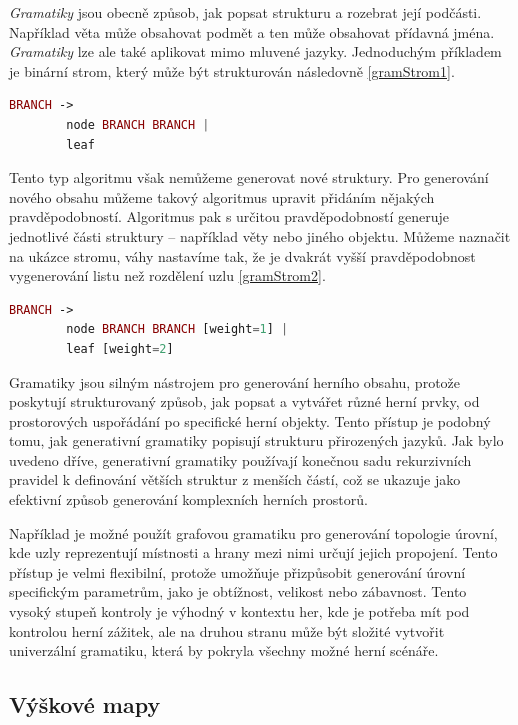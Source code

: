 \textit{Gramatiky} jsou obecně způsob, jak popsat strukturu a rozebrat její podčásti. Například věta může obsahovat podmět a ten může obsahovat přídavná jména. \textit{Gramatiky} lze ale také aplikovat mimo mluvené jazyky. Jednoduchým příkladem je binární strom, který může být strukturován následovně \vref{gramStrom1}. \cite{GramFand} \cite{GramClanek}
\begin{lstlisting}[language=php, caption=Příklad gramatiky: Strom, label=gramStrom1]
    BRANCH ->
        node BRANCH BRANCH |
        leaf
\end{lstlisting}
Tento typ algoritmu však nemůžeme generovat nové struktury. Pro generování nového obsahu můžeme takový algoritmus upravit přidáním nějakých pravděpodobností. Algoritmus pak s určitou pravděpodobností generuje jednotlivé části struktury – například věty nebo jiného objektu. Můžeme naznačit na ukázce stromu, váhy nastavíme tak, že je dvakrát vyšší pravděpodobnost vygenerování listu než rozdělení uzlu \vref{gramStrom2}. \cite{GramClanek}
\begin{lstlisting}[language=php, caption=Příklad gramatiky: Strom s váhami, label=gramStrom2]
    BRANCH ->
        node BRANCH BRANCH [weight=1] |
        leaf [weight=2]
\end{lstlisting}

Gramatiky jsou silným nástrojem pro generování herního obsahu, protože poskytují strukturovaný způsob, jak popsat a vytvářet různé herní prvky, od prostorových uspořádání po specifické herní objekty. Tento přístup je podobný tomu, jak generativní gramatiky popisují strukturu přirozených jazyků. Jak bylo uvedeno dříve, generativní gramatiky používají konečnou sadu rekurzivních pravidel k definování větších struktur z menších částí, což se ukazuje jako efektivní způsob generování komplexních herních prostorů.

Například je možné použít grafovou gramatiku pro generování topologie úrovní, kde uzly reprezentují místnosti a hrany mezi nimi určují jejich propojení. Tento přístup je velmi flexibilní, protože umožňuje přizpůsobit generování úrovní specifickým parametrům, jako je obtížnost, velikost nebo zábavnost. Tento vysoký stupeň kontroly je výhodný v kontextu her, kde je potřeba mít pod kontrolou herní zážitek, ale na druhou stranu může být složité vytvořit univerzální gramatiku, která by pokryla všechny možné herní scénáře. \cite{PCGclanek}



\subsection{Výškové mapy}

